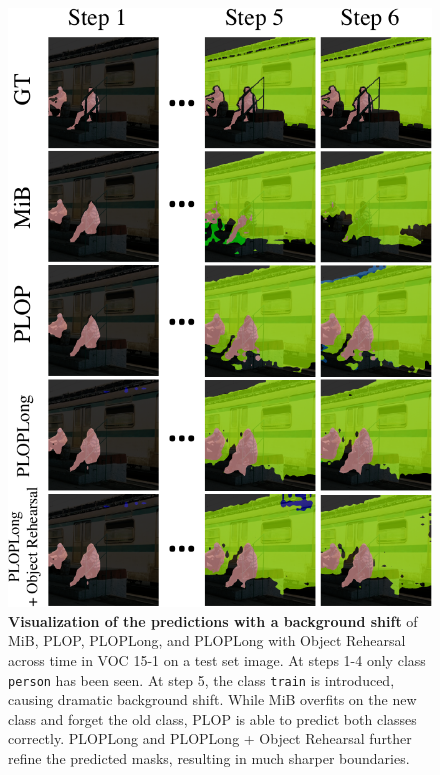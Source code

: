 \begin{figure}
    \centering
    \includegraphics[width=\linewidth]{images/seg/visualization_gt_shift2.pdf}
    \caption{\textbf{Visualization of the predictions with a background shift} of MiB, PLOP, PLOPLong, and PLOPLong with Object
        Rehearsal across time in VOC 15-1 on a test set image. At steps 1-4 only class
        \texttt{person} has been seen. At step 5, the class \texttt{train} is introduced, causing
        dramatic background shift. While MiB overfits on the new class and forget the old class,
        PLOP is able to predict both classes correctly. PLOPLong and PLOPLong + Object Rehearsal
        further refine the predicted masks, resulting in much sharper boundaries.}
    \label{fig:seg_visualization_gt_shift}
\end{figure}

